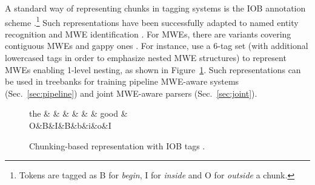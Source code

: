 \documentclass[output=paper]{LSP/langsci}
\begin{document}
A standard way of representing chunks in tagging systems is the IOB annotation scheme \citep{ramshaw1995}.\footnote{Tokens are tagged as B for \emph{begin}, I for \emph{inside} and O for \emph{outside} a chunk.} Such representations have been successfully adapted to named entity recognition \citep{tjong2002} and MWE identification \citep{vincze11,constant12}. For MWEs, there are variants covering contiguous MWEs \citep{blunsom-baldwin:2006:emnlp} and gappy ones \citep{schneider14}.
For instance, \citet{schneider14} use a 6-tag set (with additional lowercased tags in order to emphasize nested MWE structures) to represent MWEs enabling 1-level nesting, as shown in Figure~\ref{fig:iob}. Such representations can be used in treebanks for training pipeline MWE-aware systems (Sec.~\ref{sec:pipeline}) and joint MWE-aware parsers (Sec.~\ref{sec:joint}).


\begin{figure}[t]
\small
\begin{center}
\begin{dependency}[edge unit distance=2ex]
\begin{deptext}[column sep=.7cm]
the \& \color{red}{prime} \& \color{red}{minister} \& \color{blue}{made} \& \color{orange}{a} \& \color{orange}{few} \& good \& \color{blue}{decisions} \\
O\&\color{red}B\&\color{red}I\&\color{blue}B\&\color{orange}b\&\color{orange}i\&o\&\color{blue}I\\
\end{deptext}
\end{dependency}
\vspace{-0.3cm}
\caption{Chunking-based representation with IOB tags \citep{schneider14}.}
\label{fig:iob}
\end{center}
\end{figure}

\end{document}
